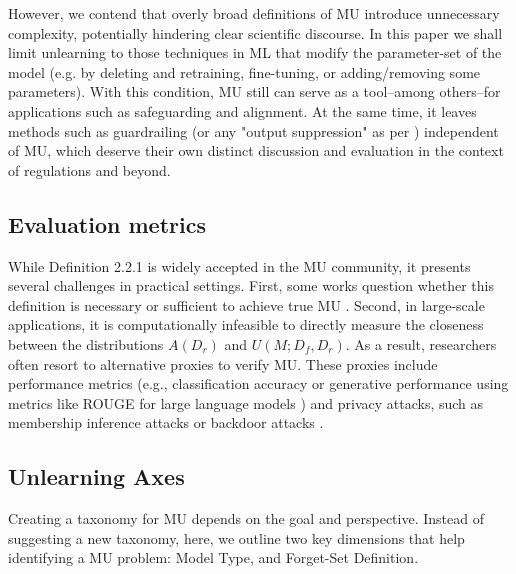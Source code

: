 However, we contend that overly broad definitions of MU introduce unnecessary complexity, potentially hindering clear scientific discourse. In this paper we shall limit unlearning to those techniques in ML that modify the parameter-set of the model (e.g. by deleting and retraining, fine-tuning, or adding/removing some parameters). With this condition, MU still can serve as a tool--among others--for applications such as safeguarding and alignment. At the same time, it leaves methods such as guardrailing (or any "output suppression" as per \cite{cooper2024machineunlearningdoesntthink}) independent of MU, which deserve their own distinct discussion and evaluation in the context of regulations and beyond.




\subsection{Evaluation metrics} 

While Definition 2.2.1 is widely accepted in the MU community, it presents several challenges in practical settings. First, some works question whether this definition is necessary or sufficient to achieve true MU \cite{thudi2022necessityauditing}. Second, in large-scale applications, it is computationally infeasible to directly measure the closeness between the distributions \( A(D_r) \) and \( U(M; D_f, D_r) \). As a result, researchers often resort to alternative proxies to verify MU. These proxies include performance metrics (e.g., classification accuracy \citep{golatkar2020eternal} or generative performance using metrics like ROUGE for large language models \citep{maini2024tofutaskfictitiousunlearning}) and privacy attacks, such as membership inference attacks or backdoor attacks \cite{hayes2024inexactunlearning, triantafillou2024arewemakingprogress}.


\subsection{Unlearning Axes} 
Creating a taxonomy for MU depends on the goal and perspective. Instead of suggesting a new taxonomy, here, we outline two key dimensions that help identifying a MU problem: Model Type, and Forget-Set Definition. 

